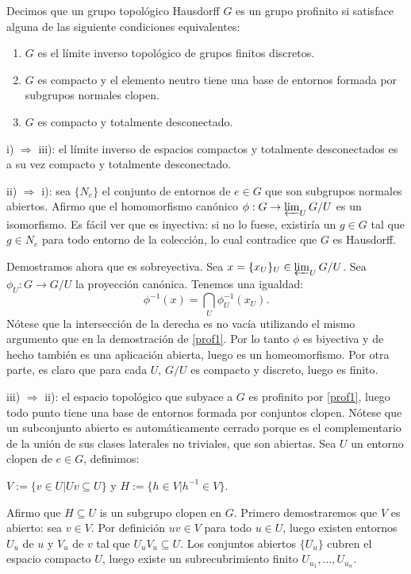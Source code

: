 \documentclass[a4paper,12pt, leqno]{report}
\begin{document}
\begin{defprop}
	Decimos que un grupo topológico Hausdorff $G$ es un grupo profinito si satisface alguna de las siguiente condiciones equivalentes:
	\begin{enumerate}[label=\roman*)]
		\item $G$ es el límite inverso topológico de grupos finitos discretos.
		\item $G$ es compacto y el elemento neutro tiene una base de entornos formada por subgrupos normales clopen. 
		\item $G$ es compacto y totalmente desconectado.
	\end{enumerate}
\end{defprop}
\begin{dem}
	i) $\Rightarrow$ iii): el límite inverso de espacios compactos y totalmente desconectados es a su vez compacto y totalmente desconectado. 
	
	ii) $\Rightarrow$ i): sea $\{N_e\}$ el conjunto de entornos de $e \in G$ que son subgrupos normales abiertos. Afirmo que el homomorfismo canónico $\phi: G \rightarrow \varprojlim_U G/U$ es un isomorfismo. Es fácil ver que es inyectiva: si no lo fuese, existiría un $g \in G$ tal que $g \in N_e$ para todo entorno de la colección, lo cual contradice que $G$ es Hausdorff. 
	
	Demostramos ahora que es sobreyectiva. Sea $x=\{x_U\}_U\in \varprojlim_U G/U$. Sea $\phi_U:G \rightarrow G/U$ la proyección canónica. Tenemos una igualdad:
	\begin{equation*}
	\phi^{-1}(x)=\bigcap\limits_{U} \phi^{-1}_U(x_U).
	\end{equation*}
	Nótese que la intersección de la derecha es no vacía utilizando el mismo argumento que en la demostración de \ref{prof1}. Por lo tanto $\phi$ es biyectiva y de hecho también es una aplicación abierta, luego es un homeomorfismo. Por otra parte, es claro que para cada $U$, $G/U$ es compacto y discreto, luego es finito. 
	
	iii) $\Rightarrow$ ii): el espacio topológico que subyace a $G$ es profinito por \ref{prof1}, luego todo punto tiene una base de entornos formada por conjuntos clopen. Nótese que un subconjunto abierto es automáticamente cerrado porque es el complementario de la unión de sus clases laterales no triviales, que son abiertas. Sea $U$ un entorno clopen de $e\in G$, definimos:
	\begin{center}
		$V:=\{v \in U|Uv\subseteq U\}$ y $H:=\{h \in V |h^{-1}\in V\}$.
	\end{center}
Afirmo que $H \subseteq U$ is un subgrupo clopen en $G$. Primero demostraremos que $V$ es abierto: sea $v\in V$. Por definición $uv \in V$ para todo $u\in U$, luego existen entornos $U_u$ de $u$ y $V_u$ de $v$ tal que $U_u V_u \subseteq U$. Los conjuntos abiertos $\{U_u\}$ cubren el espacio compacto $U$, luego existe un subrecubrimiento finito $U_{u_1},...,U_{u_n}$. 


\end{dem}
\end{document}

